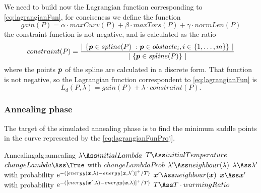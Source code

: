 \documentclass[dissertation.tex]{subfiles}
\begin{document}
We need to build now the Lagrangian function corresponding to
\cref{eq:lagrangianFun}, for conciseness we define the function
\begin{equation*}
  gain(P) = \alpha\cdot maxCurv(P)+\beta\cdot
    maxTors(P)+\gamma\cdot normLen(P)
\end{equation*}
the constraint function is not negative, and is calculated as the
ratio
\begin{equation*}
constraint(P) = \frac{\left|\ \{\boldsymbol{p} \in spline(P)\ : \boldsymbol{p}\in
    obstacle_i, i\in\{1,\dots,m\}\}\ \right|}{\left|\ \{\boldsymbol{p} \in
    spline(P)\}\ \right|}
\end{equation*}
where the points $\boldsymbol{p}$ of the spline are calculated in a discrete form. That
function is not negative, so the Lagrangian function correspondent to
\cref{eq:lagrangianFun} is
\begin{equation}\label{eq:lagrangianFunProj}
    L_d(P,\lambda)=gain(P)+\lambda\cdot constraint(P).
\end{equation}

\subsubsection{Annealing phase}
The target of the simulated annealing phase is to find the minimum
saddle points in
the curve represented by the
\cref{eq:lagrangianFunProj}.
\begin{algo}{Annealing}{alg:annealing}
  \State $\lambda\Ass initialLambda$\label{alg:annealing:initialize}
  \State $T\Ass initialTemperature$
  \label{alg:annealing:while}
  \label{alg:annealing:for}
  \State $changeLambda\Ass\True$ with $changeLambdaProb$\label{alg:annealing:lambdaProb}
  \State $\lambda'\Ass neighbour(\lambda)$\label{alg:annealing:changeLambda}
  \State $\lambda\Ass \lambda'$ with probability $\mathrm{e}^{-([energy(\boldsymbol{x},\lambda)-energy(\boldsymbol{x},\lambda')]^+/T)}$
  \Else
  \State $\ve{x}'\Ass neighbour(\ve{x})$\label{alg:annealing:changeX}
  \State $\ve{x}\Ass \ve{x}'$ with probability $\mathrm{e}^{-([energy(\boldsymbol{x}',\lambda)-energy(\boldsymbol{x},\lambda)]^+/T)}$
  \EndIf
  \EndFor
  \State $T\Ass T\cdot warmingRatio$\label{alg:annealing:cooling}
  \EndWhile
  \EndProcedure
\end{algo}
\end{document}
